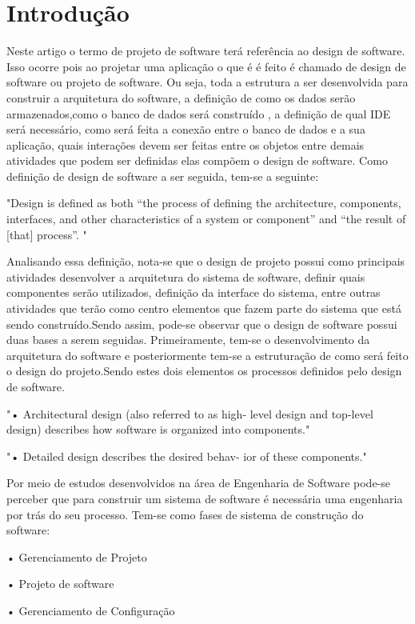 \documentclass[conference]{IEEEtran}
\begin{document}
\section{Introdução}
Neste artigo o termo de projeto de software terá referência ao design de software. Isso ocorre pois ao projetar uma aplicação o que é é feito  é chamado de design de software ou projeto de software. Ou seja, toda a estrutura a ser desenvolvida para construir a arquitetura do software, a definição de como os dados serão armazenados,como o banco de dados será construído , a definição de qual IDE será necessário, como será feita a conexão entre o banco de dados e a sua aplicação, quais interações devem ser feitas entre os objetos entre demais atividades que podem ser definidas elas compõem o design de software. Como definição de design de software a ser seguida, tem-se a seguinte: 
  
"Design is defined as both “the process of defining the architecture, components, interfaces, and other characteristics of a system or component” and “the result of [that] process”.
    "~\cite{SWEBOK2014}
    
Analisando essa definição, nota-se que o design de projeto possui como principais atividades desenvolver a arquitetura do sistema de software, definir quais componentes serão utilizados, definição da interface do sistema, entre outras atividades que terão como centro elementos que fazem parte do sistema que está sendo construído.Sendo assim, pode-se observar que o design de software possui duas bases a serem seguidas. Primeiramente, tem-se o desenvolvimento da arquitetura do software e posteriormente tem-se a estruturação de como será feito o design do projeto.Sendo estes dois elementos os processos definidos pelo design de software.

"• Architectural design (also referred to as high-
level design and top-level design) describes
how software is organized into components."~\cite{SWEBOK2014}

"• Detailed design describes the desired behav-
ior of these components." ~\cite{SWEBOK2014}

Por meio de estudos desenvolvidos na área de Engenharia de Software pode-se perceber que para construir um sistema de software é necessária uma engenharia por trás do seu processo. Tem-se como fases de sistema de construção do software:

• Gerenciamento de Projeto

• Projeto de software

• Gerenciamento de Configuração
\end{document}
